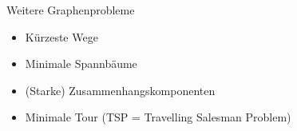 \begin{frame}{Weitere Graphenprobleme}
	\begin{itemize}[<+->]
		\item Kürzeste Wege
		\item Minimale Spannbäume
		\item (Starke) Zusammenhangskomponenten
		\item Minimale Tour (TSP = Travelling Salesman Problem)
	\end{itemize}
	

\end{frame}

